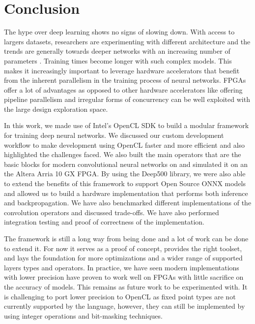 
\chapter{Conclusion} %

\label{Chapter6} %

The hype over deep learning shows no signs of slowing down. With access to largers datasets, researchers are experimenting with different architecture and the trends are generally towards deeper networks with an increasing number of parameters \citep{ddl}. Training times become longer with such complex models. This makes it increasingly important to leverage hardware accelerators that benefit from the inherent parallelism in the training process of neural networks. FPGAs offer a lot of advantages as opposed to other hardware accelerators like offering pipeline parallelism and irregular forms of concurrency can be well exploited with the large design exploration space.

In this work, we made use of Intel's OpenCL SDK to build a modular framework for training deep neural networks. We discussed our custom development workflow to make development using OpenCL faster and more efficient and also highlighted the challenges faced. We also built the main operators that are the basic blocks for modern convolutional neural networks on and simulated it on an the Altera Arria 10 GX FPGA. By using the Deep500 library, we were also able to extend the benefits of this framework to support Open Source ONNX models and allowed us to build a hardware implementation that performs both inference and backpropagation. We have also benchmarked different implementations of the convolution operators and discussed trade-offs. We have also performed integration testing and proof of correctness of the implementation. 

The framework is still a long way from being done and a lot of work can be done to extend it. For now it serves as a proof of concept, provides the right toolset, and lays the foundation for more optimizations and a wider range of supported layers types and operators. In practice, we have seen modern implementations with lower precision have proven to work well on FPGAs with little sacrifice on the accuracy of models. This remains  as future work to be experimented with. It is challenging to port lower precision to OpenCL as fixed point types are not currently supported by the language, however, they can still be implemented by using integer operations and bit-masking techniques.


